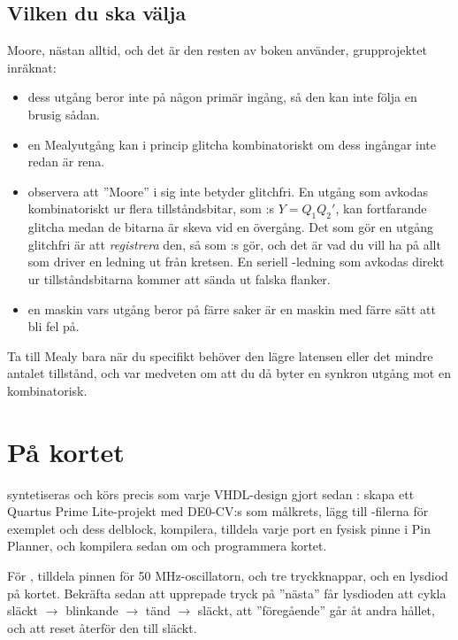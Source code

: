 \subsection*{Vilken du ska välja}
Moore, nästan alltid, och det är den resten av boken använder, grupprojektet inräknat:
\begin{itemize}
  \item dess utgång beror inte på någon primär ingång, så den kan inte följa en brusig sådan.
  \item en Mealyutgång kan i princip glitcha kombinatoriskt om dess ingångar inte redan är rena.
  \item observera att ”Moore” i sig inte betyder glitchfri. En utgång som avkodas kombinatoriskt ur
    flera tillståndsbitar, som :s $Y = Q_1 Q_2'$, kan fortfarande glitcha
    medan de bitarna är skeva vid en övergång. Det som gör en utgång glitchfri är att
    \emph{registrera} den, så som :s  gör, och det är vad du vill ha
    på allt som driver en ledning ut från kretsen. En seriell -ledning som avkodas direkt
    ur tillståndsbitarna kommer att sända ut falska flanker.
  \item en maskin vars utgång beror på färre saker är en maskin med färre sätt att bli fel på.
\end{itemize}

Ta till Mealy bara när du specifikt behöver den lägre latensen eller det mindre antalet tillstånd,
och var medveten om att du då byter en synkron utgång mot en kombinatorisk.

\section{På kortet}
\label{c8:sec:board}

 syntetiseras och körs precis som varje VHDL-design gjort sedan : skapa
ett Quartus Prime Lite-projekt med DE0-CV:s  som målkrets, lägg till
-filerna för exemplet och dess delblock, kompilera, tilldela varje port en fysisk pinne i
Pin Planner, och kompilera sedan om och programmera kortet.

För , tilldela  pinnen för 50 MHz-oscillatorn,  och
 tre tryckknappar, och  en lysdiod på kortet. Bekräfta sedan att
upprepade tryck på ”nästa” får lysdioden att cykla släckt $\to$ blinkande $\to$ tänd $\to$ släckt,
att ”föregående” går åt andra hållet, och att reset återför den till släckt.

